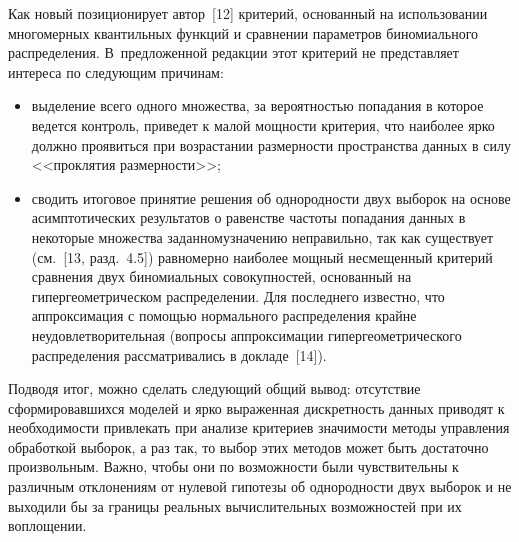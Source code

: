 \begin{multicols}{2}
      Как новый позиционирует автор~[12] критерий, основанный на использовании 
многомерных квантильных функций и сравнении параметров биномиального распределения. 
В~предложенной редакции этот критерий не представляет интереса по следующим 
причинам: 
      \begin{itemize}
\item выделение всего одного множества, за вероятностью попадания в которое ведется 
контроль, приведет к малой мощности критерия, что наиболее ярко должно проявиться 
при возрастании размерности пространства данных в силу <<проклятия размерности>>; 
\item сводить итоговое принятие решения об однородности двух выборок на основе 
асимптотических результатов о равенстве частоты попадания данных в некоторые 
множества заданному\linebreak значению неправильно, так как существует (см.~[13,  разд.~4.5]) 
равномерно наиболее мощный несмещенный критерий сравнения двух 
биномиальных совокупностей, основанный на гипергеометрическом распределении. Для 
последнего известно, что аппроксимация с помощью нормального распределения крайне 
неудовлетворительная (вопросы аппроксимации гипергеометрического распределения 
рас\-смат\-ри\-ва\-лись в докладе~[14]). 
\end{itemize}
      
      Подводя итог, можно сделать следующий общий вывод: отсутствие 
сформировавшихся моделей и ярко выраженная дискретность данных приводят к 
необходимости привлекать при анализе критериев значимости методы управления 
обработкой выборок, а раз так, то выбор этих методов может быть достаточно 
произвольным. Важно, чтобы они по возможности были чувствительны к различным 
отклонениям от нулевой гипотезы об од\-но\-род\-ности двух выборок и не выходили бы за 
границы реальных вычислительных возможностей при их воплощении. 
      

\end{multicols}
